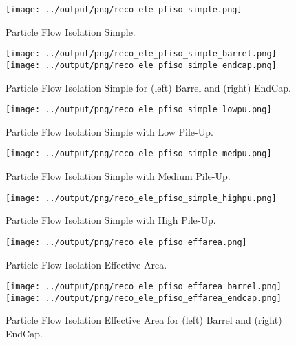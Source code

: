 \documentclass[11pt]{book}
\begin{document}
\begin{figure}[ht]
\centering
\texttt{[image: ../output/png/reco\_ele\_pfiso\_simple.png]}
\caption{Particle Flow Isolation Simple.}
\label{fig:reco_ele_pfiso_simple}
\end{figure}

\begin{figure}[ht]
\centering
\texttt{[image: ../output/png/reco\_ele\_pfiso\_simple\_barrel.png]}
\texttt{[image: ../output/png/reco\_ele\_pfiso\_simple\_endcap.png]}
\caption{Particle Flow Isolation Simple for (left) Barrel and (right) EndCap.}
\label{fig:reco_ele_pfiso_simple_regions}
\end{figure}

\begin{figure}[ht]
\centering
\texttt{[image: ../output/png/reco\_ele\_pfiso\_simple\_lowpu.png]}
\caption{Particle Flow Isolation Simple with Low Pile-Up.}
\label{fig:reco_ele_pfiso_simple_lowpu}
\end{figure}

\begin{figure}[ht]
\centering
\texttt{[image: ../output/png/reco\_ele\_pfiso\_simple\_medpu.png]}
\caption{Particle Flow Isolation Simple with Medium Pile-Up.}
\label{fig:reco_ele_pfiso_simple_medpu}
\end{figure}

\begin{figure}[ht]
\centering
\texttt{[image: ../output/png/reco\_ele\_pfiso\_simple\_highpu.png]}
\caption{Particle Flow Isolation Simple with High Pile-Up.}
\label{fig:reco_ele_pfiso_simple_highpu}
\end{figure}

\begin{figure}[ht]
\centering
\texttt{[image: ../output/png/reco\_ele\_pfiso\_effarea.png]}
\caption{Particle Flow Isolation Effective Area.}
\label{fig:reco_ele_pfiso_effarea}
\end{figure}

\begin{figure}[ht]
\centering
\texttt{[image: ../output/png/reco\_ele\_pfiso\_effarea\_barrel.png]}
\texttt{[image: ../output/png/reco\_ele\_pfiso\_effarea\_endcap.png]}
\caption{Particle Flow Isolation Effective Area for (left) Barrel and (right) EndCap.}
\label{fig:reco_ele_pfiso_effarea_regions}
\end{figure}
\end{document}
